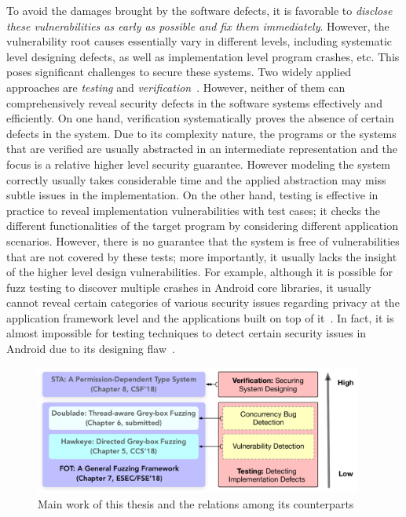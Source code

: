 To avoid the damages brought by the software defects, it is favorable to \emph{disclose these vulnerabilities as early as possible and fix them immediately}. However, the vulnerability root causes essentially vary in different levels, including systematic level designing defects, as well as implementation level program crashes, etc. This poses significant challenges to secure these systems. Two widely applied approaches are \emph{testing} and \emph{verification}~\cite{Hailpern:2002:SDT:1660992.1660994,Felderer:2016:MST:2904681.2904685,mc-at}. However, neither of them can comprehensively reveal security defects in the software systems effectively and efficiently. On one hand, verification systematically proves the absence of certain defects in the system. Due to its complexity nature, the programs or the systems that are verified are usually abstracted in an intermediate representation and the focus is a relative higher level security guarantee. However modeling the system correctly usually takes considerable time and the applied abstraction may miss subtle issues in the implementation. On the other hand, testing is effective in practice to reveal implementation vulnerabilities with test cases; it checks the different functionalities of the target program by considering different application scenarios. However, there is no guarantee that the system is free of vulnerabilities that are not covered by these tests; more importantly, it usually lacks the insight of the higher level design vulnerabilities. For example, although it is possible for fuzz testing to discover multiple crashes in Android core libraries, it usually cannot reveal certain categories of various security issues regarding privacy at the application framework level and the applications built on top of it~\cite{Enck:2009:UAS:1512148.1512324,Ernst:2014}. In fact, it is almost impossible for testing techniques to detect certain security issues in Android due to its designing flaw~\cite{url:android-flaw}.

\begin{figure}[t]
	\begin{center}
		\includegraphics[width=0.96\textwidth]{res/contributions}
		\caption{Main work of this thesis and the relations among its counterparts}
		\label{fig:works}
	\end{center}
\end{figure}



